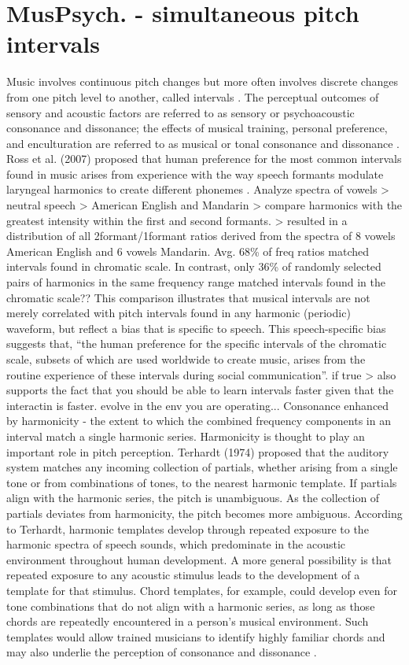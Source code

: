 \section{MusPsych. - simultaneous pitch intervals}
Music involves continuous pitch changes but more often involves discrete changes from one pitch level to another, called intervals \cite{crowder1984perception} \cite{thompson2015music}.
The perceptual outcomes of sensory and acoustic factors are referred to as sensory or psychoacoustic consonance and dissonance; the effects of musical training, personal preference, and enculturation are referred to as musical or tonal consonance and dissonance \cite{terhardt1984concept}.
Ross et al. (2007) proposed that human preference for the most common intervals found in music arises from experience with the way speech formants modulate laryngeal harmonics to create different phonemes \cite{ross2007musical}. Analyze spectra of vowels > neutral speech > American English and Mandarin >  compare harmonics with the greatest intensity within the first and second formants. > resulted in a distribution of all 2formant/1formant ratios derived from the spectra of 8 vowels American English and 6 vowels Mandarin. Avg. 68\% of freq ratios matched intervals found in chromatic scale. In contrast, only 36\% of randomly selected pairs of harmonics in the same frequency range matched intervals found in the chromatic scale?? This comparison illustrates that musical intervals are not merely correlated with pitch intervals found in any harmonic (periodic) waveform, but reflect a bias that is specific to speech. This speech-specific bias suggests that, “the human preference for the specific intervals of the chromatic scale, subsets of which are used worldwide to create music, arises from the routine experience of these intervals during social communication”. if true > also supports the fact that you should be able to learn intervals faster given that the interactin is faster. evolve in the env you are operating...
Consonance enhanced by harmonicity - the extent to which the combined frequency components in an interval match a single harmonic series. Harmonicity is thought to play an important role in pitch perception. Terhardt (1974) proposed that the auditory system matches any incoming collection of partials, whether arising from a single tone or from combinations of tones, to the nearest harmonic template. If partials align with the harmonic series, the pitch is unambiguous. As the collection of partials deviates from harmonicity, the pitch becomes more ambiguous. According to Terhardt, harmonic templates develop through repeated exposure to the harmonic spectra of speech sounds, which predominate in the acoustic environment throughout human development. A more general possibility is that repeated exposure to any acoustic stimulus leads to the development of a template for that stimulus. Chord templates, for example, could develop even for tone combinations that do not align with a harmonic series, as long as those chords are repeatedly encountered in a person’s musical environment. Such templates would allow trained musicians to identify highly familiar chords and may also underlie the perception of consonance and dissonance \cite{terhardt1974pitch} \cite{mclachlan2011neurocognitive}.
